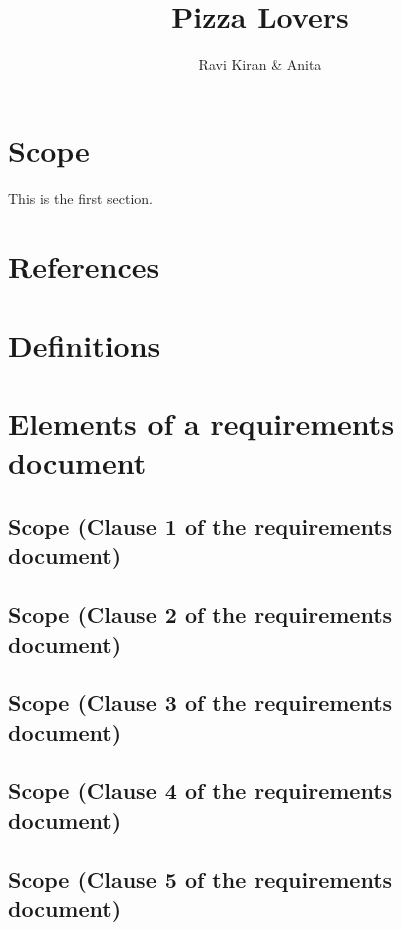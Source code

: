 \documentclass{article}
\title{Pizza Lovers}
\author{Ravi Kiran & Anita}
\date{ }
\begin{document}
\maketitle
\tableofcontents
\section{Scope}
   
This is the first section.
      

       



\section{References}
       



\section{Definitions}
       



\section{Elements of a requirements document}
\subsection{Scope (Clause 1 of the requirements document)}
\subsection{Scope (Clause 2 of the requirements document)}
\subsection{Scope (Clause 3 of the requirements document)}
\subsection{Scope (Clause 4 of the requirements document)}
\subsection{Scope (Clause 5 of the requirements document)}
       
\end{document}
